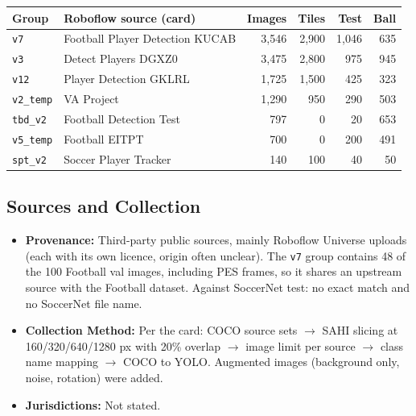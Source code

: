 \documentclass[11pt, a4paper]{article}
\begin{document}
\begin{center}\small
\begin{tabular}{@{}llrrrr@{}}
\toprule
Group & Roboflow source (card) & Images & Tiles & Test & Ball \\
\midrule
\texttt{v7} & Football Player Detection KUCAB & 3,546 & 2,900 & 1,046 & 635 \\
\texttt{v3} & Detect Players DGXZ0 & 3,475 & 2,800 & 975 & 945 \\
\texttt{v12} & Player Detection GKLRL & 1,725 & 1,500 & 425 & 323 \\
\texttt{v2\_temp} & VA Project & 1,290 & 950 & 290 & 503 \\
\texttt{tbd\_v2} & Football Detection Test & 797 & 0 & 20 & 653 \\
\texttt{v5\_temp} & Football EITPT & 700 & 0 & 200 & 491 \\
\texttt{spt\_v2} & Soccer Player Tracker & 140 & 100 & 40 & 50 \\
\bottomrule
\end{tabular}
\end{center}

\subsection{Sources and Collection}
\begin{itemize}
    \item \textbf{Provenance:} Third-party public sources, mainly Roboflow Universe uploads (each with its own licence, origin often unclear). The \texttt{v7} group contains 48 of the 100 Football val images, including PES frames, so it shares an upstream source with the Football dataset. Against SoccerNet test: no exact match and no SoccerNet file name.
    \item \textbf{Collection Method:} Per the card: COCO source sets $\rightarrow$ SAHI slicing at 160/320/640/1280 px with 20\% overlap $\rightarrow$ image limit per source $\rightarrow$ class name mapping $\rightarrow$ COCO to YOLO. Augmented images (background only, noise, rotation) were added.
    \item \textbf{Jurisdictions:} Not stated.
\end{itemize}
\end{document}
